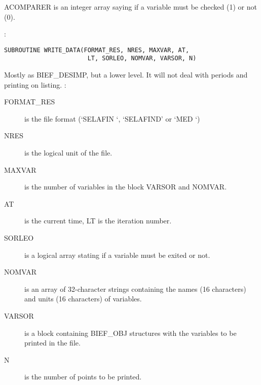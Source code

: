 ACOMPARER is an integer array saying if a variable must be checked
(1) or not (0).

%
%
%
%
%
%

:
\begin{lstlisting}[language=TelFortran]
SUBROUTINE WRITE_DATA(FORMAT_RES, NRES, MAXVAR, AT,
                       LT, SORLEO, NOMVAR, VARSOR, N)
\end{lstlisting}

Mostly as BIEF\_DESIMP, but a lower level. It will not deal with periods and
printing on listing.
:
\begin{description}
  \item [FORMAT\_RES] is the file format (`SELAFIN `, `SELAFIND' or `MED     `)
  \item [NRES] is the logical unit of the file.
  \item [MAXVAR] is the number of variables in the block VARSOR and NOMVAR.
  \item [AT] is the current time, LT is the iteration number.
  \item [SORLEO] is a logical array stating if a variable must be exited or
    not.
  \item [NOMVAR] is an array of 32-character strings containing the names (16
    characters) and units (16 characters) of variables.
  \item [VARSOR] is a block containing BIEF\_OBJ structures with the variables
    to be printed in the file.
  \item [N] is the number of points to be printed.
\end{description}

